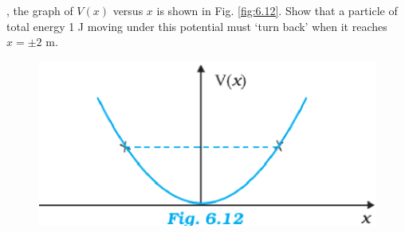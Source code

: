 \begin{enumerate}[label=\arabic*.,ref=\thesubsection.\theenumi]
,
the graph of $V(x)$ versus $x$ is shown in Fig. \ref{fig:6.12}. Show that a particle of total energy 1 J moving under this potential must ‘turn back’ when it reaches $x = \pm 2$ m.
\begin{figure}[!ht]
\centering
\includegraphics[width=\columnwidth]{./figs/11-1/6/6.12.eps}
\caption{}
\label{fig:6.10}
\end{figure}

\end{enumerate}
